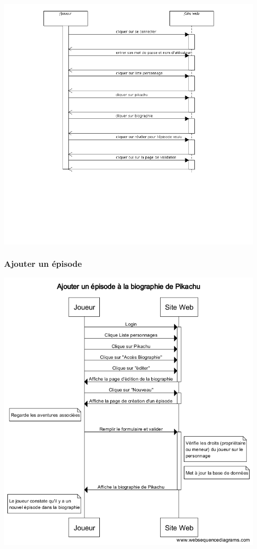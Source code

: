 \documentclass[a4paper, 11pt, titlepage]{article}
\begin{document}
\begin{center}
\includegraphics[scale=0.55]{sequence/RevelerParagAnalyse.png}
\end{center}

\subsubsection{Ajouter un épisode}

\begin{center}
\includegraphics[scale=0.55]{sequence/AjouterEpisodeBiographie.png}
\end{center}
\end{document}
